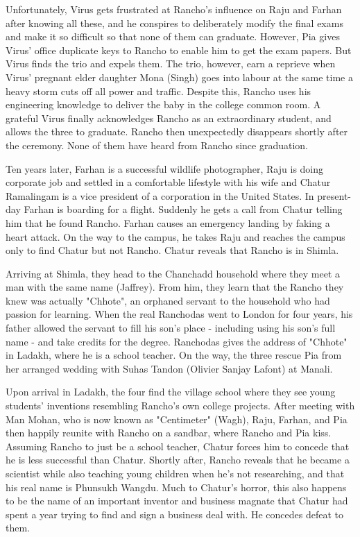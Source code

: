 \documentclass{article}
\begin{document}
Unfortunately, Virus gets frustrated at Rancho's influence on Raju and Farhan after knowing all these, and he conspires to deliberately modify the final exams and make it so difficult so that none of them can graduate. However, Pia gives Virus' office duplicate keys to Rancho to enable him to get the exam papers. But Virus finds the trio and expels them. The trio, however, earn a reprieve when Virus' pregnant elder daughter Mona (Singh) goes into labour at the same time a heavy storm cuts off all power and traffic. Despite this, Rancho uses his engineering knowledge to deliver the baby in the college common room. A grateful Virus finally acknowledges Rancho as an extraordinary student, and allows the three to graduate. Rancho then unexpectedly disappears shortly after the ceremony. None of them have heard from Rancho since graduation.

Ten years later, Farhan is a successful wildlife photographer, Raju is doing corporate job and settled in a comfortable lifestyle with his wife and Chatur Ramalingam is a vice president of a corporation in the United States. In present-day Farhan is boarding for a flight. Suddenly he gets a call from Chatur telling him that he found Rancho. Farhan causes an emergency landing by faking a heart attack. On the way to the campus, he takes Raju and reaches the campus only to find Chatur but not Rancho. Chatur reveals that Rancho is in Shimla.

Arriving at Shimla, they head to the Chanchadd household where they meet a man with the same name (Jaffrey). From him, they learn that the Rancho they knew was actually "Chhote", an orphaned servant to the household who had passion for learning. When the real Ranchodas went to London for four years, his father allowed the servant to fill his son's place - including using his son's full name - and take credits for the degree. Ranchodas gives the address of "Chhote" in Ladakh, where he is a school teacher. On the way, the three rescue Pia from her arranged wedding with Suhas Tandon (Olivier Sanjay Lafont) at Manali.

Upon arrival in Ladakh, the four find the village school where they see young students' inventions resembling Rancho's own college projects. After meeting with Man Mohan, who is now known as "Centimeter" (Wagh), Raju, Farhan, and Pia then happily reunite with Rancho on a sandbar, where Rancho and Pia kiss. Assuming Rancho to just be a school teacher, Chatur forces him to concede that he is less successful than Chatur. Shortly after, Rancho reveals that he became a scientist while also teaching young children when he's not researching, and that his real name is Phunsukh Wangdu. Much to Chatur's horror, this also happens to be the name of an important inventor and business magnate that Chatur had spent a year trying to find and sign a business deal with. He concedes defeat to them.
\end{document}
